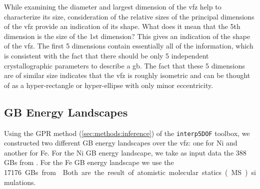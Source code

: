 \documentclass[final,twocolumn,12pt]{elsarticle}
\begin{document}
	\begin{table}[!htb]
	    \centering
    	    \caption{Dimension of \gls{pca} transformed coordinates (Dimension) and percent variance explained ($v$) for a set of \num{50000} \glspl{vfzgbo}. The first 5 dimensions cumulatively explain \percExplained{} of the variance. }
    	    \label{tab:pca-explained}
	\end{table}	
	
	While examining the diameter and largest dimension of the \gls{vfz} help to characterize its size, consideration of the relative sizes of the principal dimensions of the \gls{vfz} provide an indication of its shape. What does it mean that the 5th dimension is \percFiveVsOne{} the size of the 1st dimension? This gives an indication of the shape of the \gls{vfz}. The first 5 dimensions contain essentially all of the information, which is consistent with the fact that there should be only 5 independent crystallographic parameters to describe a \gls{gb}. The fact that these 5 dimensions are of similar size indicates that the \gls{vfz} is roughly isometric and can be thought of as a hyper-rectangle or hyper-ellipse with only minor eccentricity. 
	
	\subsection{GB Energy Landscapes}
	\label{sec:results:GBELandscapes}
	Using the GPR method (\cref{sec:methods:inference}) of the \texttt{interp5DOF} toolbox, we constructed two different GB energy landscapes over the \gls{vfz}: one for Ni and another for Fe. For the Ni GB energy landscape, we take as input data the 388 GBs from \cite{olmstedSurveyComputedGrain2009a}. For the Fe GB energy landscape we use the \SI{17176} GBs from \cite{kimPhasefieldModeling3D2014}. Both are the result of atomistic molecular statics (MS) simulations.
	
	
\end{document}
